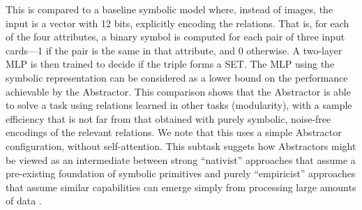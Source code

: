 This is compared to a baseline symbolic model where, instead of images, the input is a vector with 12 bits,
explicitly encoding the relations. That is, for each of the four attributes, a binary symbol is computed for each pair of three input cards---1 if the pair is the same in that attribute, and 0 otherwise. A two-layer MLP is then trained to decide if the triple forms a SET. The MLP using the symbolic representation can be considered as a lower bound on the performance achievable by the Abstractor. This comparison shows that the Abstractor is able to solve a task using relations learned in other tasks (modularity), with a sample efficiency that is not far from that obtained
with purely symbolic, noise-free encodings of the relevant relations. We note that this uses a simple Abstractor configuration, without self-attention.
This subtask suggets how Abstractors might be viewed as an intermediate between strong ``nativist'' approaches that assume a pre-existing foundation of symbolic primitives and purely ``empiricist'' approaches that assume
similar capabilities can emerge simply from processing large amounts of data \cite{howtogrowamind}.

